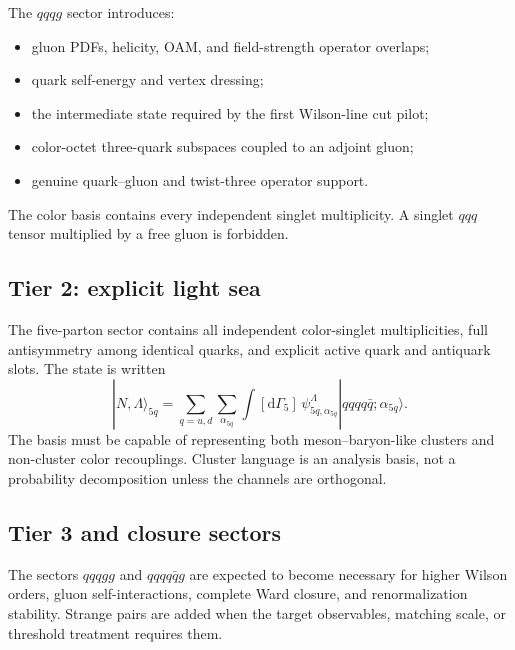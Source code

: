 \documentclass[11pt]{article}
\newcommand{\dd}{\mathrm{d}}
\begin{document}
The \(qqqg\) sector introduces:
\begin{itemize}
 \item gluon PDFs, helicity, OAM, and field-strength operator overlaps;
 \item quark self-energy and vertex dressing;
 \item the intermediate state required by the first Wilson-line cut pilot;
 \item color-octet three-quark subspaces coupled to an adjoint gluon;
 \item genuine quark--gluon and twist-three operator support.
\end{itemize}
The color basis contains every independent singlet multiplicity.  A singlet
\(qqq\) tensor multiplied by a free gluon is forbidden.

\subsection{Tier 2: explicit light sea}

The five-parton sector contains all independent color-singlet multiplicities,
full antisymmetry among identical quarks, and explicit active quark and
antiquark slots.  The state is written
\begin{equation}
 |N,\Lambda\rangle_{5q}
 =\sum_{q=u,d}
 \sum_{\alpha_{5q}}
 \int [\dd\Gamma_5]\,
 \psi^{\Lambda}_{5q,\alpha_{5q}}
 |qqqq\bar q;\alpha_{5q}\rangle.
 \label{eq:five-quark-state}
\end{equation}
The basis must be capable of representing both meson--baryon-like clusters and
non-cluster color recouplings.  Cluster language is an analysis basis, not a
probability decomposition unless the channels are orthogonal.

\subsection{Tier 3 and closure sectors}

The sectors \(qqqgg\) and \(qqqq\bar qg\) are expected to become necessary for
higher Wilson orders, gluon self-interactions, complete Ward closure, and
renormalization stability.  Strange pairs are added when the target
observables, matching scale, or threshold treatment requires them.
\end{document}
